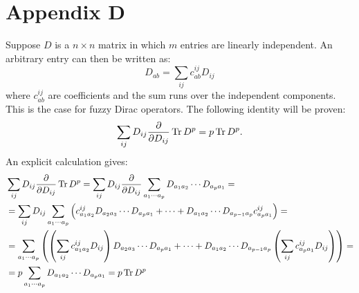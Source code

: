 \section*{Appendix D}
Suppose $D$ is a $n \times n$ matrix in which $m$ entries are linearly independent. An arbitrary entry can then be written as:
\begin{equation}
D_{ab} = \sum_{ij} c^{ij}_{ab} D_{ij}
\end{equation}
where $c^{ij}_{ab}$ are coefficients and the sum runs over the independent components. This is the case for fuzzy Dirac operators.\newline
The following identity will be proven:
\begin{equation}
\sum_{ij} D_{ij} \frac{\partial}{\partial D_{ij}} \operatorname{Tr} D^p = p \operatorname{Tr} D^p.
\end{equation}
An explicit calculation gives:
\begin{align}
&\sum_{ij} D_{ij} \frac{\partial}{\partial D_{ij}} \operatorname{Tr} D^p = \sum_{ij} D_{ij} \frac{\partial}{\partial D_{ij}} \sum_{a_1 \cdots a_p} D_{a_1 a_2} \cdots D_{a_p a_1} = \notag \\ 
&= \sum_{ij} D_{ij} \sum_{a_1 \cdots a_p} \left( c^{ij}_{a_1 a_2} D_{a_2 a_3} \cdots D_{a_p a_1} + \cdots + D_{a_1 a_2} \cdots D_{a_{p-1} a_p} c^{ij}_{a_p a_1} \right) = \notag \\
&= \sum_{a_1 \cdots a_p} \left( \left(\sum_{ij} c^{ij}_{a_1 a_2} D_{ij}\right) D_{a_2 a_3} \cdots D_{a_p a_1} + \cdots + D_{a_1 a_2} \cdots D_{a_{p-1} a_p} \left( \sum_{ij} c^{ij}_{a_p a_1} D_{ij} \right) \right) = \notag \\
&= p \sum_{a_1 \cdots a_p} D_{a_1 a_2} \cdots D_{a_p a_1} = p \operatorname{Tr} D^p 
\end{align}